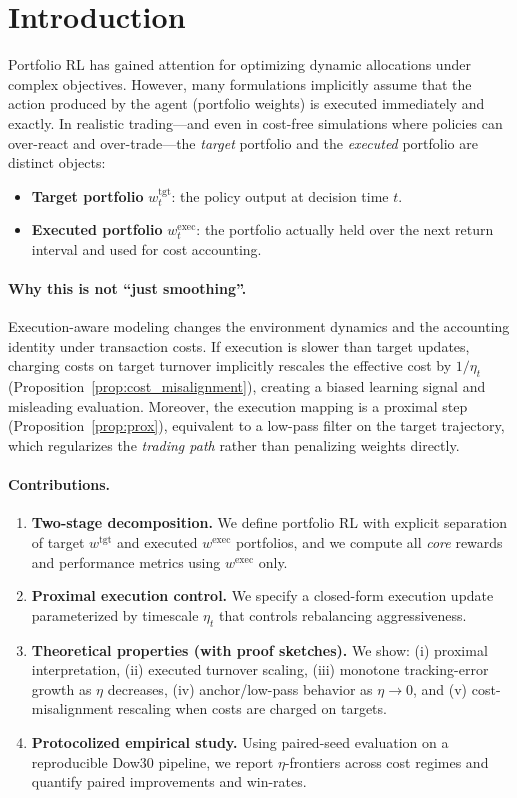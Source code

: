 \documentclass[10pt,twocolumn]{article}
\newcommand{\wexec}{w^{\mathrm{exec}}}
\newcommand{\wtgt}{w^{\mathrm{tgt}}}
\begin{document}
\section{Introduction}
Portfolio RL has gained attention for optimizing dynamic allocations under complex objectives. However, many formulations implicitly assume that the action produced by the agent (portfolio weights) is executed immediately and exactly. In realistic trading---and even in cost-free simulations where policies can over-react and over-trade---the \emph{target} portfolio and the \emph{executed} portfolio are distinct objects:
\begin{itemize}[leftmargin=*,itemsep=1pt]
\item \textbf{Target portfolio} $\wtgt_t$: the policy output at decision time $t$.
\item \textbf{Executed portfolio} $\wexec_t$: the portfolio actually held over the next return interval and used for cost accounting.
\end{itemize}

\paragraph{Why this is not ``just smoothing''.}
Execution-aware modeling changes the environment dynamics and the accounting identity under transaction costs. If execution is slower than target updates, charging costs on target turnover implicitly rescales the effective cost by $1/\eta_t$ (Proposition~\ref{prop:cost_misalignment}), creating a biased learning signal and misleading evaluation. Moreover, the execution mapping is a proximal step (Proposition~\ref{prop:prox}), equivalent to a low-pass filter on the target trajectory, which regularizes the \emph{trading path} rather than penalizing weights directly.

\paragraph{Contributions.}
\begin{enumerate}[leftmargin=*,itemsep=2pt]
\item \textbf{Two-stage decomposition.} We define portfolio RL with explicit separation of target $\wtgt$ and executed $\wexec$ portfolios, and we compute all \emph{core} rewards and performance metrics using $\wexec$ only.
\item \textbf{Proximal execution control.} We specify a closed-form execution update parameterized by timescale $\eta_t$ that controls rebalancing aggressiveness.
\item \textbf{Theoretical properties (with proof sketches).} We show: (i) proximal interpretation, (ii) executed turnover scaling, (iii) monotone tracking-error growth as $\eta$ decreases, (iv) anchor/low-pass behavior as $\eta\to0$, and (v) cost-misalignment rescaling when costs are charged on targets.
\item \textbf{Protocolized empirical study.} Using paired-seed evaluation on a reproducible Dow30 pipeline, we report $\eta$-frontiers across cost regimes and quantify paired improvements and win-rates.
\end{enumerate}
\end{document}
